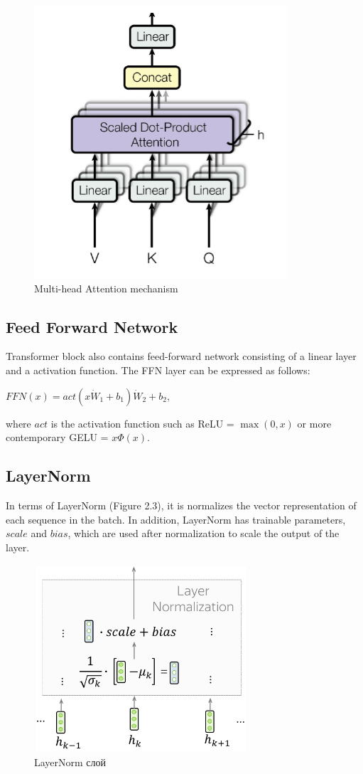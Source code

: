 \documentclass[PMI,VKR]{HSEUniversity}
\begin{document}
\begin{figure}[h]
    \centering
    \includegraphics[scale=0.7]{img/multi-head.png}
    \caption{Multi-head Attention mechanism}
\end{figure}

\subsection{Feed Forward Network}

Transformer block also contains feed-forward network consisting of a linear layer and a activation function.
The FFN layer can be expressed as follows:
\begin{center}
    $FFN(x) = act(x \dot W_{1} + b_{1}) \dot W_{2} + b_{2}$, \\    
\end{center}
where $act$ is the activation function such as ReLU = $\max(0, x)$ or more contemporary GELU = $x\Phi(x)$.

\subsection{LayerNorm}

In terms of LayerNorm (Figure 2.3), it is normalizes the vector representation of each sequence in the batch. 
In addition, LayerNorm has trainable parameters, $scale$ and $bias$, which are used after normalization to scale the output of the layer.

\begin{figure}[h]
    \centering
    \includegraphics[scale=1]{img/layer_norm.png}
    \caption{LayerNorm слой}
\end{figure}
\end{document}
